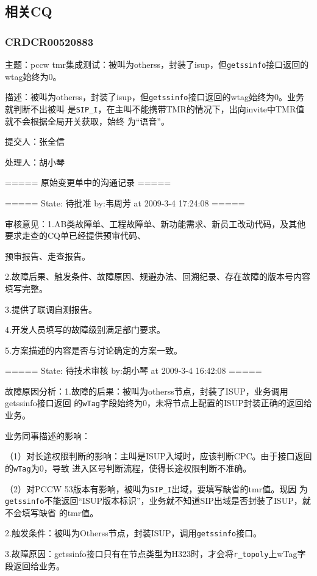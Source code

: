 \documentclass[12pt,a4paper,onecolumn]{article}
\begin{document}
\subsection{相关CQ}
\subsubsection{CRDCR00520883}

主题：pccw tmr集成测试：被叫为otherss，封装了isup，但\lstinline{getssinfo}接口返回的wtag始终为0。

描述：被叫为otherss，封装了isup，但\lstinline{getssinfo}接口返回的wtag始终为0。业务就判断不出被叫
是\lstinline{SIP_I}，在主叫不能携带TMR的情况下，出向invite中TMR值就不会根据全局开关获取，始终
为“语音”。

提交人：张全信

处理人：胡小琴

===== 原始变更单中的沟通记录 =====

===== State: 待批准 by:韦周芳 at 2009-3-4 17:24:08 =====

审核意见：1.AB类故障单、工程故障单、新功能需求、新员工改动代码，及其他要求走查的CQ单已经提供预审代码、

预审报告、走查报告。

2.故障后果、触发条件、故障原因、规避办法、回溯纪录、存在故障的版本号内容填写完整。

3.提供了联调自测报告。

4.开发人员填写的故障级别满足部门要求。

5.方案描述的内容是否与讨论确定的方案一致。


===== State: 待技术审核 by:胡小琴 at 2009-3-4 16:42:08 =====

故障原因分析：1.故障的后果：被叫为otherss节点，封装了ISUP，业务调用getssinfo接口返回
的\lstinline{wTag}字段始终为0，未将节点上配置的ISUP封装正确的返回给业务。

   业务同事描述的影响： 

   （1）对长途权限判断的影响：主叫是ISUP入域时，应该判断CPC。由于接口返回的\lstinline{wTag}为0，导致
   进入区号判断流程，使得长途权限判断不准确。


   （2）对PCCW 53版本有影响，被叫为\lstinline{SIP_I}出域，要填写缺省的tmr值。现因
   为\lstinline{getssinfo}不能返回“ISUP版本标识”，业务就不知道SIP出域是否封装了ISUP，就不会填写缺省
   的tmr值。

   2.触发条件：被叫为Otherss节点，封装ISUP，调用\lstinline{getssinfo}接口。

3.故障原因：getssinfo接口只有在节点类型为H323时，才会将\lstinline{r_topoly}上wTag字段返回给业务。 
\end{document}

